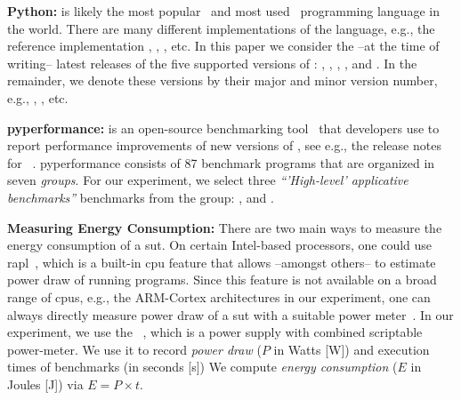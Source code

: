\noindent\textbf{Python:} is likely the most popular~\cite{djurdjev2024popularity,pypl,tiobe} and most used~\cite{stackover, statista} programming language in the world.
There are many different implementations of the language, e.g., the reference implementation \cp, , , etc.
In this paper we consider the --at the time of writing-- latest releases of the five supported versions of \cp: , , , , and .
In the remainder, we denote these versions by their major and minor version number, e.g., , , etc.

\noindent\textbf{\acrlong{pyperformance}:} is an open-source benchmarking tool~\cite{pyperf_git} that \cp developers use to report performance improvements of new versions of \cp, see e.g., the release notes for ~\cite{py312}.
\gls{pyperformance} consists of 87 benchmark programs that are organized in seven \emph{groups}.
For our experiment, we select three \textit{``'High-level' applicative benchmarks''}\cite{pyperf_docs} benchmarks from the  group: ,  and .


\noindent\textbf{Measuring Energy Consumption:} There are two main ways to measure the energy consumption of a \gls{sut}.
On certain Intel-based processors, one could use \gls{rapl}~\cite{khan2018rapl}, which is a built-in \gls{cpu} feature that allows --amongst others-- to estimate power draw of running programs.
Since this feature is not available on a broad range of \glspl{cpu}, e.g., the ARM-Cortex architectures in our experiment, one can always directly measure power draw of a \gls{sut} with a suitable power meter~\cite{kavanagh2019rapid}.
In our experiment, we use the ~\cite{otii_website,qoitech2022otii}, which is a power supply with combined scriptable power-meter.
We use it to record \emph{power draw} ($P$ in Watts [W]) and execution times of benchmarks (in seconds [s])
We compute \emph{energy consumption} ($E$ in Joules [J]) via $E = P \times t$.